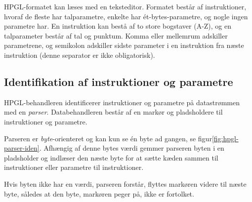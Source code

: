 HPGL-formatet kan læses med en teksteditor. Formatet består af
instruktioner, hvoraf de fleste har talparametre, enkelte har
ét-bytes-parametre, og nogle ingen parametre har. En instruktion kan
bestå af to store bogstaver (A-Z), og en talparameter består af tal og
punktum. Komma eller mellemrum adskiller parametrene, og semikolon
adskiller sidste parameter i en instruktion fra næste instruktion
(denne separator er ikke obligatorisk).


\subsection{Identifikation af instruktioner og parametre}
\label{sc:idn-ins-param}


HPGL-behandleren identificerer instruktioner og parametre på
datastrømmen med en \textit{parser}. Databehandleren består af en
markør og pladsholdere til instruktioner og parametre.

Parseren er \textit{byte}-orienteret og kan kun se én byte ad gangen,
se figur\vref{fig:hpgl-parser-iden}. Afhængig af denne bytes værdi
gemmer parseren byten i en pladsholder og indlæser den næste byte for
at sætte kæden sammen til instruktioner eller parametre til
instruktioner.


Hvis byten ikke har en værdi, parseren forstår, flyttes markøren
videre til næste byte, således at den byte, markøren peger på, ikke er
fortolket.

